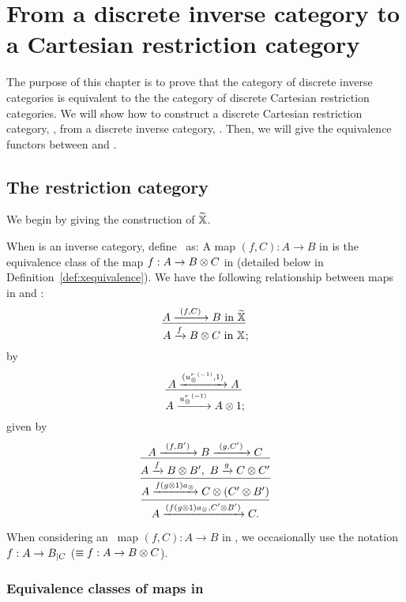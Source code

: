 \chapter{From a discrete inverse category to a Cartesian restriction category} %
\label{chap:completing_a_discrete_inverse_category}

The purpose of this chapter is to prove that the category of discrete inverse categories is
equivalent to the the category of discrete Cartesian restriction categories. We will show
how to construct a discrete Cartesian restriction category, \Xt, from a discrete inverse
category, \X. Then, we will give the equivalence functors between \X and \Xt.

\section{The restriction category \hypXt} %
\label{sec:the_restriction_category_hypxt}


We begin by giving the construction of $\widetilde{\mathbb{X}}$.

\begin{definition}\label{def:xt}
  When \X is an inverse category, define \Xt\ as:
  {
    A map $(f,C):A\to B$ in \Xt is the equivalence class of the map $f:A\to B\otimes C$ in \X (detailed below in
    Definition~\ref{def:xequivalence}). We have the following relationship between maps in \Xt and \X: %
    \[
      \infer{A\xrightarrow{f} B\*C \text{ in }\X}{A \xrightarrow{\ (f,C)\ } B \text{ in } \Xt};
    \]
  }
  {%
    by
    \[
      \infer{A\xrightarrow{\inv{u_{\*}^r}}A\* 1}
            {A \xrightarrow{(\inv{u_{\*}^r}, 1)} A};
    \]
  }
  {%
    given by
    \[
      \infer{
        \infer{
          \infer{A\xrightarrow{(f (g\*1) a_{\*},C' \* B')} C.}{A\xrightarrow{f (g\*1) a_{\*}} C \* (C' \* B')}
        }{A \xrightarrow{f} B\*B',\ B \xrightarrow{g} C\*C'}
      }{A \xrightarrow{\ (f,B')\ } B \xrightarrow{\ (g,C')\ } C}
    \]
  }

\end{definition}

When considering an \Xt\ map $(f,C):A\to B$ in \X, we occasionally use the notation $f:A\to
{B}_{|{C}}$ ($\equiv f:A\to B\otimes C$).

\subsection{Equivalence classes of maps in \hypX} %
\label{sec:equivalence_classes_of_maps_in_hypx}


